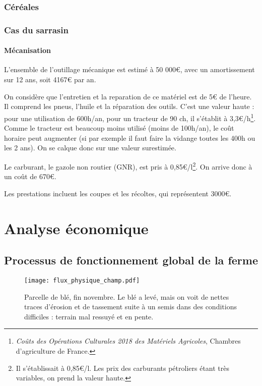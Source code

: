 \documentclass{book}
\begin{document}
\subsection{Céréales}

\subsection{Cas du sarrasin}

\subsubsection{Mécanisation}

L'ensemble de l'outillage mécanique est estimé à 50 000\euro{}, avec un amortissement sur 12 ans, soit 4167\euro{} par an.

On considère que l'entretien et la reparation de ce matériel est de 5\euro{} de l'heure. Il comprend les pneus, l'huile et la réparation des outils. C'est une valeur haute : pour une utilisation de 600h/an, pour un tracteur de 90 ch, il s'établit à 3,3\euro{}/h\footnote{\textit{Coûts des Opérations Culturales 2018 des Matériels Agricoles}, Chambres d'agriculture de France.}. Comme le tracteur est beaucoup moins utilisé (moins de 100h/an), le coût horaire peut augmenter (si par exemple il faut faire la vidange toutes les 400h ou les 2 ans). On se calque donc sur une valeur surestimée.

Le carburant, le gazole non routier (GNR), est pris à 0,85\euro{}/l\footnote{Il s'établissait à 0,85\euro{}/l. Les prix des carburants pétroliers étant très variables, on prend la valeur haute.}. On arrive donc à un coût de 670\euro{}.

Les prestations incluent les coupes et les récoltes, qui représentent 3000\euro{}.

\chapter{Analyse économique}
\label{part:chap_eco}
\section{Processus de fonctionnement global de la ferme}

\begin{figure}[h!]
\begin{center}
	\texttt{[image: flux\_physique\_champ.pdf]}
	\caption{Parcelle de blé, fin novembre. Le blé a levé, mais on voit de nettes traces d'érosion et de tassement suite à un semis dans des conditions difficiles : terrain mal ressuyé et en pente.}
	\label{fig:rot_cercle}
\end{center}
\end{figure}
\end{document}
